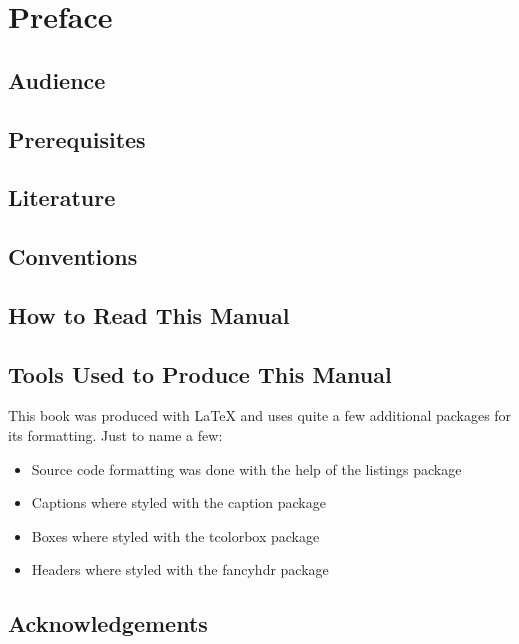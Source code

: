 
\chapter{Preface}

\section*{Audience}

\section*{Prerequisites}

\section*{Literature}

\section*{Conventions}

\section*{How to Read This Manual}

\section*{Tools Used to Produce This Manual}
This book was produced with \LaTeX{} and uses quite a few additional packages for its formatting. Just to name a few:
\begin{itemize}
\item Source code formatting was done with the help of the listings package
\item Captions where styled with the caption package
\item Boxes where styled with the tcolorbox package
\item Headers where styled with the fancyhdr package
\end{itemize}

\section*{Acknowledgements}

\cleardoublepage %
